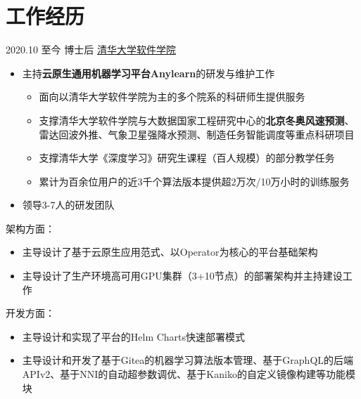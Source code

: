 \documentclass[letterpaper]{twentysecondcv} %
\begin{document}
\vspace{-0.6cm}
\section{工作经历}

\begin{twentyfluid}

\twentyitemfluid
    {2020.10 至今}
    {博士后}
    {\href{https://www.thss.tsinghua.edu.cn/index.htm}{清华大学软件学院}}
    {\\     }
    {
    {
    \vspace{-0.2cm}
    \begin{itemize}
        \item 主持\textbf{云原生通用机器学习平台Anylearn}的研发与维护工作
        \begin{itemize}
            \item 面向以清华大学软件学院为主的多个院系的科研师生提供服务
            \item 支撑清华大学软件学院与大数据国家工程研究中心的\textbf{北京冬奥风速预测}、雷达回波外推、气象卫星强降水预测、制造任务智能调度等重点科研项目
            \item 支撑清华大学《深度学习》研究生课程（百人规模）的部分教学任务
            \item 累计为百余位用户的近3千个算法版本提供超2万次/10万小时的训练服务
        \end{itemize}
        \item 领导3-7人的研发团队
    \end{itemize}
    架构方面：
    \vspace{-0.1cm}
    \begin{itemize}
        \item 主导设计了基于云原生应用范式、以Operator为核心的平台基础架构
        \item 主导设计了生产环境高可用GPU集群（3+10节点）的部署架构并主持建设工作
    \end{itemize}
    开发方面：
    \vspace{-0.1cm}
    \begin{itemize}
        \item 主导设计和实现了平台的Helm Charts快速部署模式
        \item 主导设计和开发了基于Gitea的机器学习算法版本管理、基于GraphQL的后端APIv2、基于NNI的自动超参数调优、基于Kaniko的自定义镜像构建等功能模块

\end{itemize}}}
\end{twentyfluid}
\end{document}
